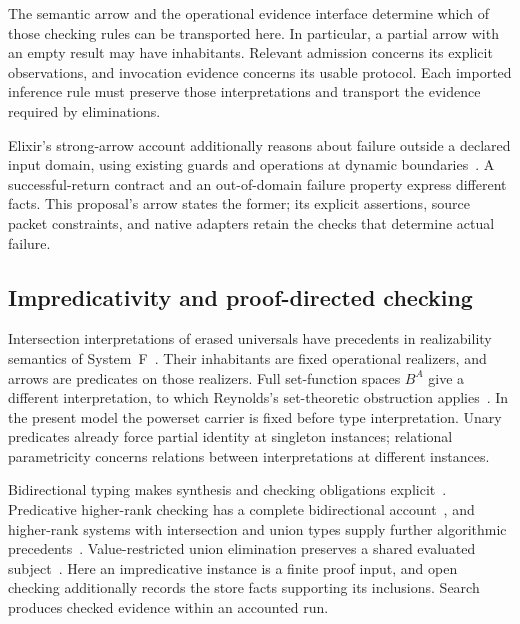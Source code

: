 \documentclass[10pt,a4paper]{article}
\theoremstyle{remark}
\begin{document}
The semantic arrow and the operational evidence interface determine which of
those checking rules can be transported here. In particular, a partial arrow
with an empty result may have inhabitants. Relevant admission concerns its
explicit observations, and invocation evidence concerns its usable protocol.
Each imported inference rule must preserve those interpretations and transport
the evidence required by eliminations.

Elixir's strong-arrow account additionally reasons about failure outside a
declared input domain, using existing guards and operations at dynamic
boundaries~\cite{elixirstrong}. A successful-return contract and an
out-of-domain failure property express different facts. This proposal's arrow
states the former; its explicit assertions, source packet constraints, and
native adapters retain the checks that determine actual failure.

\subsection{Impredicativity and proof-directed checking}
Intersection interpretations of erased universals have precedents in
realizability semantics of System~F~\cite{pistone}. Their inhabitants are fixed
operational realizers, and arrows are predicates on those realizers. Full
set-function spaces $B^A$ give a different interpretation, to which Reynolds's
set-theoretic obstruction applies~\cite{reynolds}. In the present model the
powerset carrier is fixed before type interpretation. Unary predicates already
force partial identity at singleton instances; relational parametricity concerns
relations between interpretations at different instances.

Bidirectional typing makes synthesis and checking obligations
explicit~\cite{bidirectional}. Predicative higher-rank checking has a complete
bidirectional account~\cite{dunfield}, and higher-rank systems with intersection
and union types supply further algorithmic precedents~\cite{jiang}.
Value-restricted union elimination preserves a shared evaluated
subject~\cite{unions}. Here an impredicative instance is a finite proof input,
and open checking additionally records the store facts supporting its
inclusions. Search produces checked evidence within an accounted run.
\end{document}
